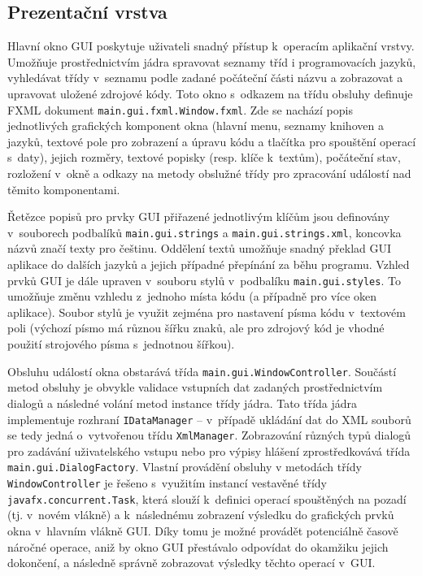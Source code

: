 \documentclass[czech,BP]{thesiskiv}
\begin{document}
\subsection{Prezentační vrstva}
Hlavní okno GUI poskytuje uživateli snadný přístup k~operacím aplikační vrstvy. Umožňuje prostřednictvím jádra spravovat seznamy tříd i programovacích jazyků, vyhledávat třídy v~seznamu podle zadané počáteční části názvu a zobrazovat a upravovat uložené zdrojové kódy. Toto okno s~odkazem na třídu obsluhy definuje FXML dokument \texttt{main.gui.fxml.Window.fxml}. Zde se nachází popis jednotlivých grafických komponent okna (hlavní menu, seznamy knihoven a jazyků, textové pole pro zobrazení a úpravu kódu a tlačítka pro spouštění operací s~daty), jejich rozměry, textové popisky (resp. klíče k~textům), počáteční stav, rozložení v~okně a odkazy na metody obslužné třídy pro zpracování událostí nad těmito komponentami.\par
Řetězce popisů pro prvky GUI přiřazené jednotlivým klíčům jsou definovány v~souborech podbalíků \texttt{main.gui.strings} a \texttt{main.gui.strings.xml}, koncovka názvů  značí texty pro češtinu. Oddělení textů umožňuje snadný překlad GUI aplikace do dalších jazyků a jejich případné přepínání za běhu programu. Vzhled prvků GUI je dále upraven v~souboru stylů v~podbalíku \texttt{main.gui.styles}. To umožňuje změnu vzhledu z~jednoho místa kódu (a případně pro více oken aplikace). Soubor stylů je využit zejména pro nastavení písma kódu v~textovém poli (výchozí písmo má různou šířku znaků, ale pro zdrojový kód je vhodné použití strojového písma s~jednotnou šířkou).\par
Obsluhu událostí okna obstarává třída \texttt{main.gui.WindowController}. Součástí metod obsluhy je obvykle validace vstupních dat zadaných prostřednictvím dialogů a následné volání metod instance třídy jádra. Tato třída jádra implementuje rozhraní \texttt{IDataManager} -- v~případě ukládání dat do XML souborů se tedy jedná o~vytvořenou třídu \texttt{XmlManager}. Zobrazování různých typů dialogů pro zadávání uživatelského vstupu nebo pro výpisy hlášení zprostředkovává třída \texttt{main.gui.DialogFactory}. Vlastní provádění obsluhy v metodách třídy \texttt{WindowController} je řešeno s~využitím instancí vestavěné třídy \texttt{javafx.concurrent.Task}, která slouží k~definici operací spouštěných na pozadí (tj. v~novém vlákně) a k~následnému zobrazení výsledku do grafických prvků okna v~hlavním vlákně GUI. Díky tomu je možné provádět potenciálně časově náročné operace, aniž by okno GUI přestávalo odpovídat do okamžiku jejich dokončení, a následně správně zobrazovat výsledky těchto operací v~GUI.\par
\end{document}
